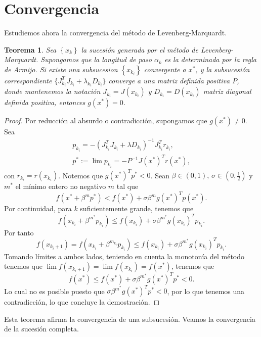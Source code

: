 \documentclass[11pt,a4paper]{book}
\newtheorem{theorem}{Teorema}[chapter]
\theoremstyle{definition}
\theoremstyle{remark}
\newcommand{\sucesionxk}{\left\{x_k\right\}}
\newcommand{\sucesion}[1]{\left\{#1\right\}}
\begin{document}
\section{Convergencia}
Estudiemos ahora la convergencia del método de Levenberg-Marquardt.
\begin{theorem}\label{th:subsucLM}
Sea $\sucesionxk$ la sucesión generada por el método de Levenberg-Marquardt. Supongamos que la longitud de paso $\alpha_k$ es la determinada por la regla de Armijo. Si existe una subsucesion $\sucesion{x_{k_i}}$ convergente a $x^*$, y la subsucesión correspondiente $\{J_{k_i}^TJ_{k_i}+\lambda_{k_i}D_{k_i}\}$ converge a una matriz definida positiva $P$, donde mantenemos la notación $J_{k_i}=J(x_{k_i})$ y $D_{k_i}=D(x_{k_i})$ matriz diagonal definida positiva, entonces $g(x^*)=0$.
\end{theorem}
\begin{proof}
Por reducción al absurdo o contradicción, supongamos que $g(x^*)\neq 0$. Sea
\begin{align}
p_{k_i} = 
-(J^T_{k_i}J_{k_i}+\lambda D_{k_i})^{-1}J^T_{k_i}r_{k_i}, \\
p^* := \lim p_{k_i} = -P^{-1}J(x^*)^Tr(x^*),
\end{align}
con $r_{k_i} = r(x_{k_i})$. Notemos que $g(x^*)^Tp^*<0$. Sean $\beta \in (0,1),\,\sigma \in (0,\frac{1}{2})$ y $m^*$ el mínimo entero no negativo $m$ tal que
\begin{equation}
f(x^*+\beta^mp^*)<f(x^*)+\sigma\beta^mg(x^*)^Tp(x^*).
\end{equation}
Por continuidad, para $k$ suficientemente grande, tenemos que
\begin{equation}
f(x_{k_i}+\beta^{m^*}p_{k_i}) \leq 
f(x_{k_i})+\sigma\beta^{m^*}g(x_{k_i})^Tp_{k_i}.
\end{equation}
Por tanto
\begin{equation}
f(x_{k_i+1})=f(x_{k_i}+\beta^{m_{k_i}}p_{k_i})
\leq f(x_{k_i})+\sigma \beta^{m^*}g(x_{k_i})^Tp_{k_i}.
\end{equation}
Tomando límites a ambos lados, teniendo en cuenta la monotonía del método tenemos que $\lim f(x_{k_i+1}) = \lim f(x_{k_i}) = f(x^*)$, tenemos que
\begin{equation}
f(x^*) \leq f(x^*) + \sigma \beta^{m^*}g(x^*)^Tp^*<0.
\end{equation}
Lo cual no es posible puesto que $\sigma \beta^{m^*}g(x^*)^Tp^*<0$, por lo que tenemos una contradicción, lo que concluye la demostración.
\end{proof}
Esta teorema afirma la convergencia de una subsucesión. Veamos la convergencia de la sucesión completa.
\end{document}
